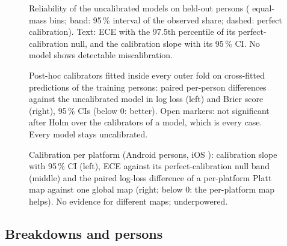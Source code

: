 \begin{figure}[tbp]
\centering
{}
\caption{Reliability of the uncalibrated models on held-out persons ( equal-mass bins; band: 95\,\% interval of
the observed share; dashed: perfect calibration). Text: ECE with the 97.5th percentile of its perfect-calibration
null, and the calibration slope with its 95\,\% CI. No model shows detectable miscalibration.}
\label{fig:M2_07_calibration}\label{fig:app:m2-calibration}
\end{figure}

\begin{figure}[tbp]
\centering
{}
\caption{Post-hoc calibrators fitted inside every outer fold on cross-fitted predictions of the training
persons: paired per-person differences against the uncalibrated model in log loss (left) and Brier score
(right), 95\,\% CIs (below 0: better). Open markers: not significant after Holm over the
 calibrators of a model, which is every case. Every model stays uncalibrated.}
\label{fig:M2_12_calibration_remedies}\label{fig:app:m2-remedies}
\end{figure}

\begin{figure}[tbp]
\centering
{}
\caption{Calibration per platform (Android  persons, iOS
): calibration slope with 95\,\% CI (left), ECE against its
perfect-calibration null band (middle) and the paired log-loss difference of a per-platform Platt map against
one global map (right; below 0: the per-platform map helps). No evidence for different maps; underpowered.}
\label{fig:M2_08_calibration_platform}\label{fig:app:m2-platform}
\end{figure}



\FloatBarrier
\subsection{Breakdowns and persons}\label{app:m2:breakdown}

